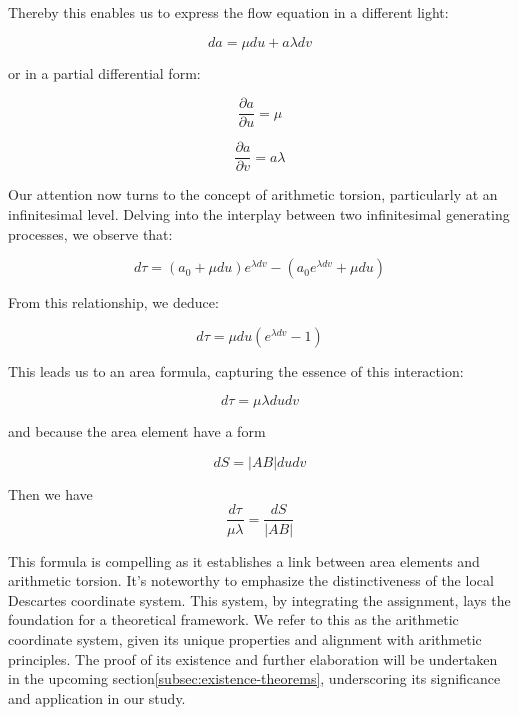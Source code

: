 \documentclass{article}
\numberwithin{definition}{section}
\numberwithin{lemma}{section}
\numberwithin{proposition}{section}
\numberwithin{corollary}{section}
\numberwithin{theorem}{section}
\begin{document}
Thereby this enables us to express the flow equation in a different light:

\begin{equation}
    da = \mu du + a \lambda dv
\end{equation}

or in a partial differential form:

\begin{equation}
    \frac{\partial a}{\partial u} = \mu
\end{equation}

\begin{equation}
    \frac{\partial a}{\partial v} = a \lambda
\end{equation}

Our attention now turns to the concept of arithmetic torsion, particularly at an infinitesimal level.
Delving into the interplay between two infinitesimal generating processes, we observe that:

\begin{equation}
    d\tau = (a_0 + \mu du) e^{\lambda dv} - (a_0 e^{\lambda dv} + \mu du)
\end{equation}

From this relationship, we deduce:

\begin{equation}
    d\tau = \mu du (e^{\lambda dv} - 1)
\end{equation}

This leads us to an area formula, capturing the essence of this interaction:

\begin{equation}
    d\tau = \mu \lambda du dv \label{eq:area_formula}
\end{equation}

and because the area element have a form

\begin{equation}
    dS = |AB| du dv \label{eq:area_element}
\end{equation}

Then we have
\begin{equation}
    \frac{d\tau}{\mu \lambda} = \frac{dS}{|AB|}\label{eq:area_formula2}
\end{equation}

This formula is compelling as it establishes a link between area elements and arithmetic torsion.
It's noteworthy to emphasize the distinctiveness of the local Descartes coordinate system.
This system, by integrating the assignment, lays the foundation for a theoretical framework.
We refer to this as the arithmetic coordinate system, given its unique properties and alignment with arithmetic principles.
The proof of its existence and further elaboration will be undertaken in the upcoming section\ref{subsec:existence-theorems},
underscoring its significance and application in our study.
\end{document}
